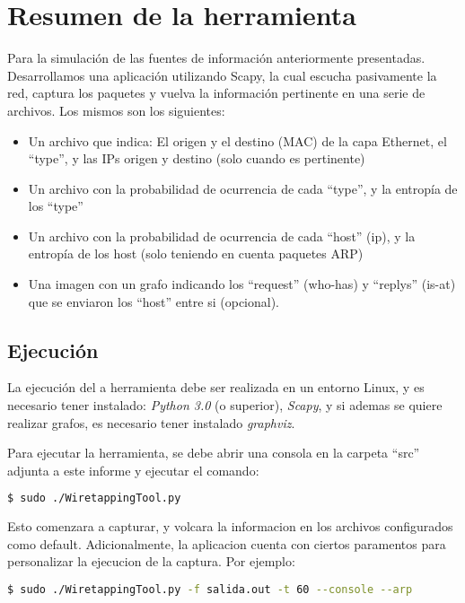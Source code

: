 \section{Resumen de la herramienta}

Para la simulación de las fuentes de información anteriormente presentadas. Desarrollamos una aplicación utilizando Scapy, la cual escucha pasivamente la red, captura los paquetes y vuelva la información pertinente en una serie de archivos. Los mismos son los siguientes:

\begin{itemize}
	\item Un archivo que indica: El origen y el destino (MAC) de la capa Ethernet, el ``type'', y las IPs origen y destino (solo cuando es pertinente)
	\item Un archivo con la probabilidad de ocurrencia de cada ``type'', y la entropía de los ``type''
	\item Un archivo con la probabilidad de ocurrencia de cada ``host'' (ip), y la entropía de los host (solo teniendo en cuenta paquetes ARP)
	\item Una imagen con un grafo indicando los ``request'' (who-has) y ``replys'' (is-at) que se enviaron los ``host'' entre si (opcional).
\end{itemize}

\subsection{Ejecución}

La ejecución del a herramienta debe ser realizada en un entorno Linux, y es necesario tener instalado: \textit{Python 3.0} (o superior), \textit{Scapy}, y si ademas se quiere realizar grafos, es necesario tener instalado \textit{graphviz}.

Para ejecutar la herramienta, se debe abrir una consola en la carpeta ``src'' adjunta a este informe y ejecutar el comando:

\begin{lstlisting}[language=bash]
  $ sudo ./WiretappingTool.py
\end{lstlisting}

Esto comenzara a capturar, y volcara la informacion en los archivos configurados como default.
Adicionalmente, la aplicacion cuenta con ciertos paramentos para personalizar la ejecucion de la captura. Por ejemplo:

\begin{lstlisting}[language=bash]
  $ sudo ./WiretappingTool.py -f salida.out -t 60 --console --arp
\end{lstlisting}

